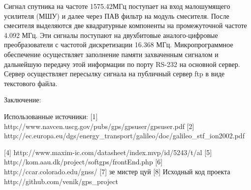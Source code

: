 \documentclass[a4paper,12pt]{article}
\numberwithin{equation}{section}		%
\numberwithin{table}{section}
\begin{document}
Сигнал спутника на частоте 1575.42МГц поступает на вход малошумящего усилителя (МШУ) и далее через ПАВ фильтр на модуль смесителя. После смесителя выделяются две квадратурные компоненты на промежуточной частоте 4.092 МГц. Эти сигналы поступают на двухбитовые аналого-цифровые преобразователи с частотой дискретизации 16.368 МГц. Микропрограммное обеспечение осуществляет заполнение памяти захваченным сигналом и дальнейшую передачу этой информации по порту RS-232 на основной сервер. Сервер осуществляет пересылку сигнала на публичный сервер ftp в виде текстового файла.

Заключение:

Использованные источники:
[1] http://www.navcen.uscg.gov/pubs/gps/gpsuser/gpsuser.pdf
[2] http://ec.europa.eu/dgs/energy\_transport/galileo/doc/galileo\_stf\_ion2002.pdf


[4] http://www.maxim-ic.com/datasheet/index.mvp/id/5243/t/al
[5] http://kom.aau.dk/project/softgps/frontEnd.php
[6] http://ccar.colorado.edu/gnss/
[7] зе мистер цуй
[8] Исходный код проекта http://github.com/venik/gps\_project


\end{document}
